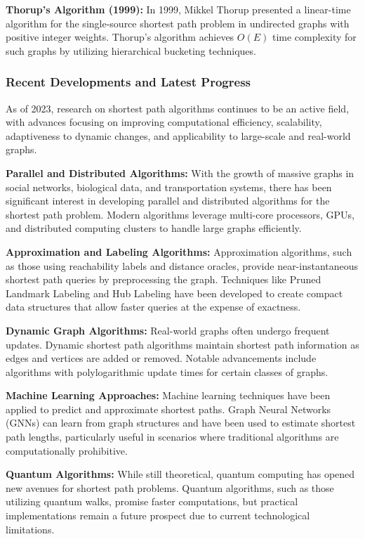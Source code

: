 \documentclass[11pt]{article}
\theoremstyle{plain}
\begin{document}
\textbf{Thorup's Algorithm (1999):} In 1999, Mikkel Thorup presented a linear-time algorithm for the single-source shortest path problem in undirected graphs with positive integer weights. Thorup's algorithm achieves \( O(E) \) time complexity for such graphs by utilizing hierarchical bucketing techniques.

\subsubsection{Recent Developments and Latest Progress}

As of 2023, research on shortest path algorithms continues to be an active field, with advances focusing on improving computational efficiency, scalability, adaptiveness to dynamic changes, and applicability to large-scale and real-world graphs.

\textbf{Parallel and Distributed Algorithms:} With the growth of massive graphs in social networks, biological data, and transportation systems, there has been significant interest in developing parallel and distributed algorithms for the shortest path problem. Modern algorithms leverage multi-core processors, GPUs, and distributed computing clusters to handle large graphs efficiently.

\textbf{Approximation and Labeling Algorithms:} Approximation algorithms, such as those using reachability labels and distance oracles, provide near-instantaneous shortest path queries by preprocessing the graph. Techniques like Pruned Landmark Labeling and Hub Labeling have been developed to create compact data structures that allow faster queries at the expense of exactness.

\textbf{Dynamic Graph Algorithms:} Real-world graphs often undergo frequent updates. Dynamic shortest path algorithms maintain shortest path information as edges and vertices are added or removed. Notable advancements include algorithms with polylogarithmic update times for certain classes of graphs.

\textbf{Machine Learning Approaches:} Machine learning techniques have been applied to predict and approximate shortest paths. Graph Neural Networks (GNNs) can learn from graph structures and have been used to estimate shortest path lengths, particularly useful in scenarios where traditional algorithms are computationally prohibitive.

\textbf{Quantum Algorithms:} While still theoretical, quantum computing has opened new avenues for shortest path problems. Quantum algorithms, such as those utilizing quantum walks, promise faster computations, but practical implementations remain a future prospect due to current technological limitations.
\end{document}
